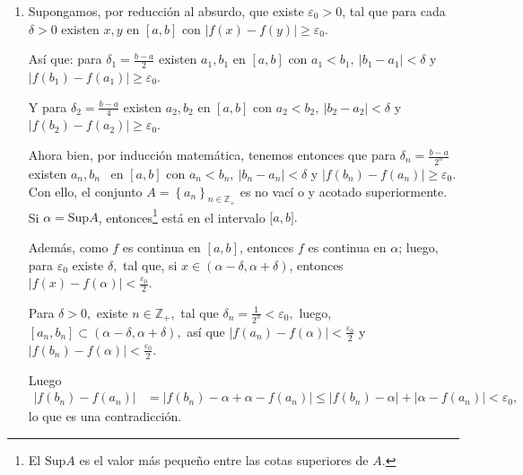 \begin{enumerate}[leftmargin=1.2em,   itemindent=0pt,       labelwidth=\labelwidth,labelsep=0.5em,]

\item Supongamos, por reducción al absurdo, que existe $\varepsilon _{0}>0$,
tal que para cada $\delta >0$ existen $x,y$ en $[a,b]$ con $\left\vert
f\left( x\right) -f\left( y\right) \right\vert \geq \varepsilon _{0}.$

Así que: para $\delta _{1}=\frac{b-a}{2}$ existen $a_{1},b_{1}$ en $[a,b]$ con $%
a_{1}<b_{1},\ \left\vert b_{1}-a_{1}\right\vert <\delta $ y
$\left\vert f\left( b_{1}\right) -f\left( a_{1}\right) \right\vert
\geq \varepsilon _{0}$.

Y para $\delta _{2}=\frac{b-a}{4}$ existen $a_{2},b_{2}$ en $[a,b]$ con $%
a_{2}<b_{2},\ \left\vert b_{2}-a_{2}\right\vert <\delta $ y
$\left\vert f\left( b_{2}\right) -f\left( a_{2}\right) \right\vert
\geq \varepsilon _{0}$.

Ahora bien, por inducción matemática, tenemos entonces que para $\delta _{n}=\frac{b-a}{2^{n}}$ existen $a_{n},b_{n}$ \ en $[a,b]$ con $%
a_{n}<b_{n},\ \left\vert b_{n}-a_{n}\right\vert <\delta $ y\linebreak
$\left\vert f\left( b_{n}\right) -f\left( a_{n}\right) \right\vert
\geq \varepsilon _{0}.$ Con ello, el conjunto $A=\left\{ a_{n}\right\} _{n\in \mathbb{Z}_{+}}$ es no vací%
o y acotado superiormente. Si $\alpha=\text{Sup}A$, entonces\footnote{ El
$\text{Sup}A$ es el valor más pequeño entre las cotas superiores
de $A$.} está en el intervalo $\lbrack a,b].$

Además, como $f$ es continua en $[a,b]$, entonces $f$ es continua en $\alpha $; luego, para $%
\varepsilon _{0}$ existe $\delta ,$ tal que, si $x\in \left( \alpha
-\delta ,\alpha +\delta \right) $, entonces $\left\vert f\left(
x\right) -f\left( \alpha \right) \right\vert <\frac{\varepsilon
_{0}}{2}$.

Para $\delta >0,$ existe $n\in \mathbb{Z}_{+},$ tal que $\delta _{n}=\frac{1%
}{2^{n}}<\varepsilon _{0},$ luego, $\left[ a_{n},b_{n}\right] \subset \left(
\alpha -\delta ,\alpha +\delta \right) ,$ así que $\left\vert f\left(
a_{n}\right) -f\left( \alpha \right) \right\vert <\frac{\varepsilon _{0}}{2}$
y $\left\vert f\left( b_{n}\right) -f\left( \alpha \right) \right\vert <%
\frac{\varepsilon _{0}}{2}.$

Luego \
{\footnotesize
\begin{align*}
\left\vert f\left( b_{n}\right) -f\left( a_{n}\right) \right\vert
&=\left\vert f\left( b_{n}\right) -\alpha +\alpha -f\left( a_{n}\right)
\right\vert \leq \left\vert f\left( b_{n}\right) -\alpha \right\vert
+\left\vert \alpha -f\left( a_{n}\right) \right\vert <\varepsilon _{0},
\end{align*}
}
lo que es una contradicción.


\end{enumerate}
